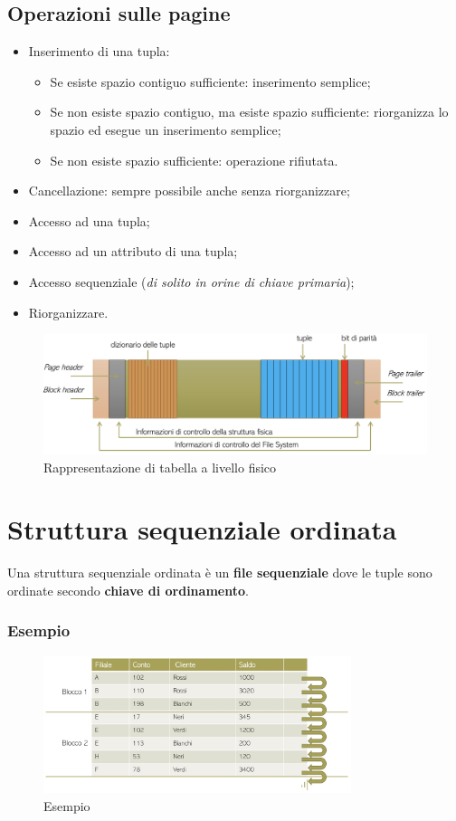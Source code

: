 \documentclass[oneside,a4paper,11pt]{book}
\theoremstyle{italicstyle}
\theoremstyle{normStyle}
\begin{document}
\subsection{Operazioni sulle pagine}
\begin{itemize}
    \item Inserimento di una tupla:
    \begin{itemize}
        \item Se esiste spazio contiguo sufficiente: inserimento semplice;
        \item Se non esiste spazio contiguo, ma esiste spazio sufficiente: riorganizza 
        lo spazio ed esegue un inserimento semplice;
        \item Se non esiste spazio sufficiente: operazione rifiutata.
    \end{itemize}
    \item Cancellazione: sempre possibile anche senza riorganizzare;
    \item Accesso ad una tupla;
    \item Accesso ad un attributo di una tupla;
    \item Accesso sequenziale (\textit{di solito in orine di chiave primaria});
    \item Riorganizzare.
\end{itemize}
\begin{figure}[H]
    \centering
    \includegraphics[width=15cm]{img/Tabella_livello_fisico.png}
    \caption{Rappresentazione di tabella a livello fisico}
    \label{fig:tab_liv_fis}
\end{figure}
\section{Struttura sequenziale ordinata}
Una struttura sequenziale ordinata è un \textbf{file sequenziale}  dove 
le tuple sono ordinate secondo \textbf{chiave di ordinamento}.
\subsubsection{Esempio}
\begin{figure}[H]
    \centering
    \includegraphics[width=9cm]{img/esempio_index.jpeg}
    \caption{Esempio}
    \label{fig:Es_index}
\end{figure}
\end{document}
